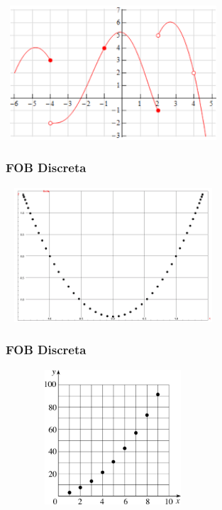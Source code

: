 \documentclass{beamer}
\begin{document}
\begin{frame}
{	\includegraphics[width=8cm,height=5cm]{descontinua2.png}	
	}
	\only<6>
	{
	\frametitle{FOB Discreta}
	\includegraphics[width=8cm,height=5cm]{discreta1.png}	
	}
	{
	\frametitle{FOB Discreta}
	\includegraphics[width=8cm,height=5cm]{discreta2.png}	
	}
\end{frame}
\end{document}
